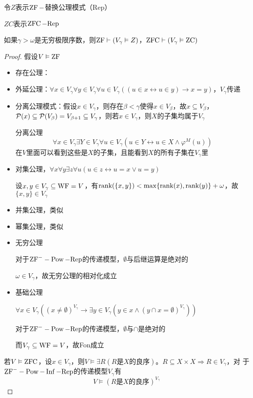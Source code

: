 \documentclass[11pt]{article}
\def \Rep {\text{Rep}}
\def \ZC {\text{ZC}}
\begin{document}
令\(Z\)表示\(\operatorname{ZF}-\)替换公理模式（Rep）

\(ZC\)表示\(\ZFC-\Rep\)

\begin{theorem}[]
如果\(\gamma>\omega\)是无穷极限序数，则\(\operatorname{ZF}\vdash(V_\gamma\vDash Z)\)，\(\ZFC\vdash(V_\gamma\vDash\ZC)\)
\end{theorem}

\begin{proof}
假设\(V\vDash\operatorname{ZF}\)
\begin{itemize}
\item 存在公理：
\item 外延公理：\(\forall x\in V_\gamma\forall y\in V_\gamma\forall u\in V_\gamma((u\in x\leftrightarrow u\in y)\to x=y)\)，\(V_\gamma\)传递
\item 分离公理模式：假设\(x\in V_\gamma\)，则存在\(\beta<\gamma\)使得\(x\in V_\beta\)，故\(x\subseteq V_\beta\)，
\(\mathcal{P}(x)\subseteq\mathcal{P}(V_\beta)=V_{\beta+1}\subseteq V_\gamma\)，则若\(x\in V_\gamma\)，则\(X\)的子集均属于\(V_\gamma\)

分离公理
\begin{equation*}
\forall x\in V_\gamma\exists Y\in V_\gamma\forall u\in V_\gamma(u\in Y\leftrightarrow u\in X\wedge\varphi^M(u))
\end{equation*}
在\(V\)里面可以看到这些是\(X\)的子集，且能看到\(X\)的所有子集在\(V_\gamma\)里
\item 对集公理，\(\forall x\forall y\exists z\forall u(u\in z\leftrightarrow u=x\vee u=y)\)

设\(x,y\in V_\gamma\subseteq\operatorname{WF}=V\)，有\(\text{rank}(\{x,y\})<\max\{\text{rank}(x),\text{rank}(y)\}+\omega\)，故\(\{x,y\}\in V_\gamma\)
\item 并集公理，类似
\item 幂集公理，类似
\item 无穷公理

对于\(\ZFm-\Pow-\Rep\)的传递模型，\(\emptyset\)与后继运算是绝对的

\(\omega\in V_\gamma\)，故无穷公理的相对化成立
\item 基础公理

\(\forall x\in V_\gamma((x\neq\emptyset)^{V_\gamma}\to\exists y\in V_\gamma(y\in x\wedge(y\cap x=\emptyset)^{V_\gamma}))\)

对于\(\ZFm-\Pow-\Rep\)的传递模型，\(\emptyset\)与\(\cap\)是绝对的

而\(V_\gamma\subseteq\operatorname{WF}=V\)，故Fon成立
\end{itemize}



若\(V\vDash\operatorname{ZFC}\)，设\(x\in V_\gamma\)，则\(V\vDash\exists R(R\text{是$X$的良序})\)。\(R\subseteq X\times X\Rightarrow R\in V_\gamma\)，对
于\(\ZFm-\Pow-\Inf-\Rep\)的传递模型\(V_\gamma\)有
\begin{equation*}
V\vDash(R\text{是$X$的良序})^{V_\gamma}
\end{equation*}
\end{proof}
\end{document}
